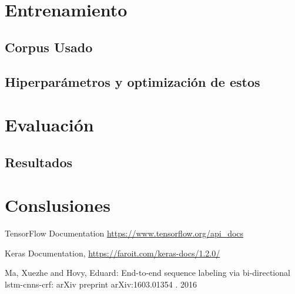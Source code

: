 \documentclass[runningheads]{llncs}
\begin{document}
\section{Entrenamiento}

\subsection{Corpus Usado}

\subsection{Hiperparámetros y optimización de estos}

\section{Evaluación}

\subsection{Resultados}

\section{Conslusiones}


\begin{thebibliography}{8}
TensorFlow Documentation \url{https://www.tensorflow.org/api_docs} 

Keras Documentation, \url{https://faroit.com/keras-docs/1.2.0/}

Ma, Xuezhe and Hovy, Eduard:
End-to-end sequence labeling via bi-directional lstm-cnns-crf:
arXiv preprint arXiv:1603.01354 . 2016 

\end{thebibliography}
\end{document}
